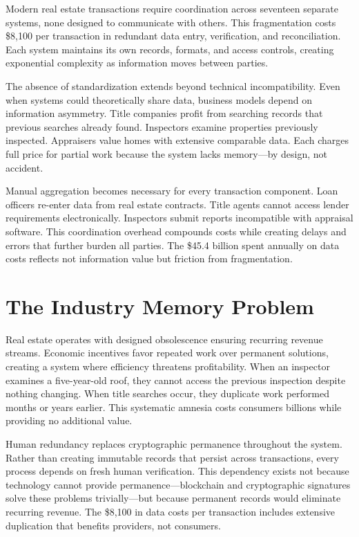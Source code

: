 Modern real estate transactions require coordination across seventeen separate systems, none designed to communicate with others. This fragmentation costs \$8{,}100 per transaction in redundant data entry, verification, and reconciliation. Each system maintains its own records, formats, and access controls, creating exponential complexity as information moves between parties.

The absence of standardization extends beyond technical incompatibility. Even when systems could theoretically share data, business models depend on information asymmetry. Title companies profit from searching records that previous searches already found. Inspectors examine properties previously inspected. Appraisers value homes with extensive comparable data. Each charges full price for partial work because the system lacks memory—by design, not accident.

Manual aggregation becomes necessary for every transaction component. Loan officers re-enter data from real estate contracts. Title agents cannot access lender requirements electronically. Inspectors submit reports incompatible with appraisal software. This coordination overhead compounds costs while creating delays and errors that further burden all parties. The \$45.4 billion spent annually on data costs reflects not information value but friction from fragmentation.

\section{The Industry Memory Problem}

Real estate operates with designed obsolescence ensuring recurring revenue streams. Economic incentives favor repeated work over permanent solutions, creating a system where efficiency threatens profitability. When an inspector examines a five-year-old roof, they cannot access the previous inspection despite nothing changing. When title searches occur, they duplicate work performed months or years earlier. This systematic amnesia costs consumers billions while providing no additional value.

Human redundancy replaces cryptographic permanence throughout the system. Rather than creating immutable records that persist across transactions, every process depends on fresh human verification. This dependency exists not because technology cannot provide permanence—blockchain and cryptographic signatures solve these problems trivially—but because permanent records would eliminate recurring revenue. The \$8{,}100 in data costs per transaction includes extensive duplication that benefits providers, not consumers.

